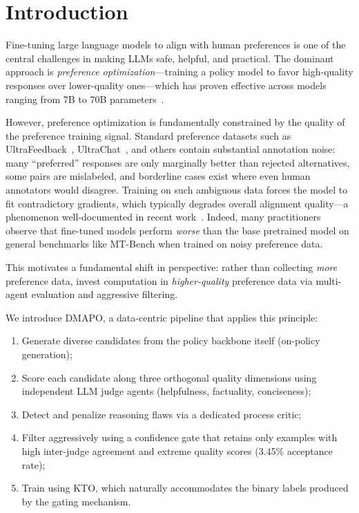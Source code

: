 \documentclass{article}
\newcommand{\ours}{\textsc{DMAPO}}
\begin{document}
\section{Introduction}
\label{sec:intro}

Fine-tuning large language models to align with human preferences is one of the central challenges in making LLMs safe, helpful, and practical.
The dominant approach is \emph{preference optimization}---training a policy model to favor high-quality responses over lower-quality ones---which has proven effective across models ranging from 7B to 70B parameters~\cite{rafailov2023dpo,jiang2023mistral}.

However, preference optimization is fundamentally constrained by the quality of the preference training signal.
Standard preference datasets such as UltraFeedback~\cite{cui2023ultrafeedback}, UltraChat~\cite{ding2023ultracheap}, and others contain substantial annotation noise: many ``preferred'' responses are only marginally better than rejected alternatives, some pairs are mislabeled, and borderline cases exist where even human annotators would disagree.
Training on such ambiguous data forces the model to fit contradictory gradients, which typically degrades overall alignment quality---a phenomenon well-documented in recent work~\cite{rafailov2023dpo}.
Indeed, many practitioners observe that fine-tuned models perform \emph{worse} than the base pretrained model on general benchmarks like MT-Bench when trained on noisy preference data.

This motivates a fundamental shift in perspective: rather than collecting \emph{more} preference data, invest computation in \emph{higher-quality} preference data via multi-agent evaluation and aggressive filtering.

We introduce \ours{}, a data-centric pipeline that applies this principle:
\begin{enumerate}[leftmargin=*,itemsep=0.5ex]
  \item Generate diverse candidates from the policy backbone itself (on-policy generation);
  \item Score each candidate along three orthogonal quality dimensions using independent LLM judge agents (helpfulness, factuality, conciseness);
  \item Detect and penalize reasoning flaws via a dedicated process critic;
  \item Filter aggressively using a confidence gate that retains only examples with high inter-judge agreement and extreme quality scores (3.45\% acceptance rate);
  \item Train using KTO, which naturally accommodates the binary labels produced by the gating mechanism.
\end{enumerate}
\end{document}
